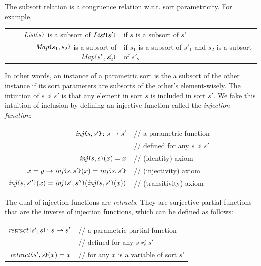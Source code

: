 \documentclass[UTF8,11pt]{article}
\theoremstyle{plain}
\theoremstyle{definition}
\theoremstyle{remark}
\newcommand{\List}{\textit{List}}
\newcommand{\Map}{\textit{Map}}
\newcommand{\parametric}[2]{{#1}\raisebox{.2ex}{\texttt{\footnotesize{\{}}}#2\raisebox{.2ex}{\texttt{\footnotesize{\}}}}}
\newcommand{\doubleslash}{/\!/{ }}
\newcommand{\sharpsymbol}{\#}
\newcommand{\KSort}{\texttt{\sharpsymbol Sort}}
\newcommand{\KSortList}{\texttt{\sharpsymbol SortList}}
\newcommand{\inj}[2]{\parametric{\mathit{inj}}{#1, #2}}
\newcommand{\retract}[2]{\parametric{\mathit{retract}}{#1, #2}}
\begin{document}
The subsort relation is a congruence relation w.r.t. sort parametricity.
For example,
\begin{center}
\begin{tabular}{rl}
	$\parametric{\List}{s}$ is a subsort of $\parametric{\List}{s'}$ 
	& if $s$ is a subsort of $s'$ \\
	$\parametric{\Map}{s_1,s_2}$ is a subsort of $\parametric{\Map}{s'_1,s'_2}$
	& if $s_1$ is a subsort of $s'_1$ and $s_2$ is a subsort of $s'_2$
\end{tabular}
\end{center}
In other words, an instance of a parametric sort is the a subsort of the other 
instance if its sort parameters are subsorts of the other's element-wisely.
The intuition of $s \preceq s'$ is that any element in sort $s$ is included 
in sort $s'$.
We fake this intuition of inclusion by defining an injective function 
called the \emph{injection function}:
\begin{center}
	\begin{tabular}{rl}
		$\inj{s}{s'} \colon s \to s'$
		& \doubleslash a parametric function \\
		& \doubleslash defined for any $s \preceq 
		s'$ \\
		$\inj{s}{s}(x) = x$
		& \doubleslash (identity) axiom \\
		$x = y \to \inj{s}{s'}(x) = \inj{s}{s'}$
		& \doubleslash (injectivity) axiom \\
		$\inj{s}{s''}(x) = \inj{s'}{s''}(\inj{s}{s'}(x))$
		& \doubleslash (transitivity) axiom \\
	\end{tabular}
\end{center}

The dual of injection functions are \emph{retracts}. 
They are surjective partial functions that are the inverse of injection 
functions, which can be defined as follows:
\begin{center}
	\begin{tabular}{rl}
		$\retract{s'}{s} \colon s \rightharpoonup s'$
		& \doubleslash a parametric partial function \\
		& \doubleslash defined for any $s \preceq 
		s'$ \\
		$\retract{s'}{s}(x) = x$
		& \doubleslash for any $x$ is a variable of sort $s'$
	\end{tabular}
\end{center}
\end{document}
